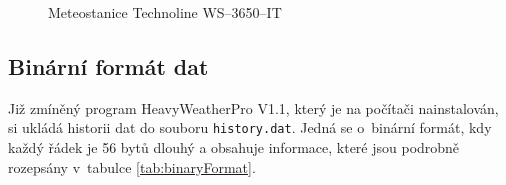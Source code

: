 \begin{figure}[h]
    \centering
	\caption{Meteostanice Technoline WS–3650–IT}
	\label{fig:stanice}
\end{figure}

\subsection{Binární formát dat}
Již zmíněný program HeavyWeatherPro V1.1, který je na počítači nainstalován, si ukládá historii dat do souboru \texttt{history.dat}. Jedná se o~binární formát, kdy každý řádek je 56 bytů dlouhý a obsahuje informace, které jsou podrobně rozepsány v~tabulce \ref{tab:binaryFormat}.

